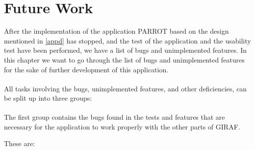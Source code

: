 \chapter{Future Work}

After the implementation of the application PARROT based on the design mentioned in \autoref{appd} has stopped, and the test of the application and the usability test have been performed, we have a list of bugs and unimplemented features.\newline
In this chapter we want to go through the list of bugs and unimplemented features for the sake of further development of this application.\\
\\
All tasks involving the bugs, unimplemented features, and other deficiencies, can be split up into three groups:\\
\\
The first group contains the bugs found in the tests and features that are necessary for the application to work properly with the other parts of GIRAF.\newline 

These are:

